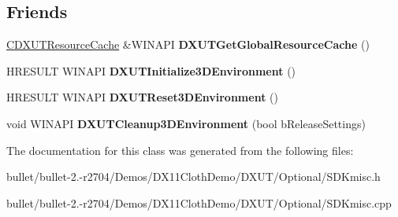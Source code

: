 \subsection*{Friends}
\begin{DoxyCompactItemize}
\item 
\hypertarget{class_c_d_x_u_t_resource_cache_a793d385bc3e0d7f2cd55d197c9581a0e}{\hyperlink{class_c_d_x_u_t_resource_cache}{C\+D\+X\+U\+T\+Resource\+Cache} \&W\+I\+N\+A\+P\+I {\bfseries D\+X\+U\+T\+Get\+Global\+Resource\+Cache} ()}\label{class_c_d_x_u_t_resource_cache_a793d385bc3e0d7f2cd55d197c9581a0e}

\item 
\hypertarget{class_c_d_x_u_t_resource_cache_a8fc52624a662fef7d83bd47cf227eb22}{H\+R\+E\+S\+U\+L\+T W\+I\+N\+A\+P\+I {\bfseries D\+X\+U\+T\+Initialize3\+D\+Environment} ()}\label{class_c_d_x_u_t_resource_cache_a8fc52624a662fef7d83bd47cf227eb22}

\item 
\hypertarget{class_c_d_x_u_t_resource_cache_a298e39426c9301e902cee8996fe2fb8b}{H\+R\+E\+S\+U\+L\+T W\+I\+N\+A\+P\+I {\bfseries D\+X\+U\+T\+Reset3\+D\+Environment} ()}\label{class_c_d_x_u_t_resource_cache_a298e39426c9301e902cee8996fe2fb8b}

\item 
\hypertarget{class_c_d_x_u_t_resource_cache_a37d9950b3e0f407d23dbb37910fd339b}{void W\+I\+N\+A\+P\+I {\bfseries D\+X\+U\+T\+Cleanup3\+D\+Environment} (bool b\+Release\+Settings)}\label{class_c_d_x_u_t_resource_cache_a37d9950b3e0f407d23dbb37910fd339b}

\end{DoxyCompactItemize}


The documentation for this class was generated from the following files\+:\begin{DoxyCompactItemize}
\item 
bullet/bullet-\/2.-\/r2704/\+Demos/\+D\+X11\+Cloth\+Demo/\+D\+X\+U\+T/\+Optional/S\+D\+Kmisc.\+h\item 
bullet/bullet-\/2.-\/r2704/\+Demos/\+D\+X11\+Cloth\+Demo/\+D\+X\+U\+T/\+Optional/S\+D\+Kmisc.\+cpp\end{DoxyCompactItemize}
